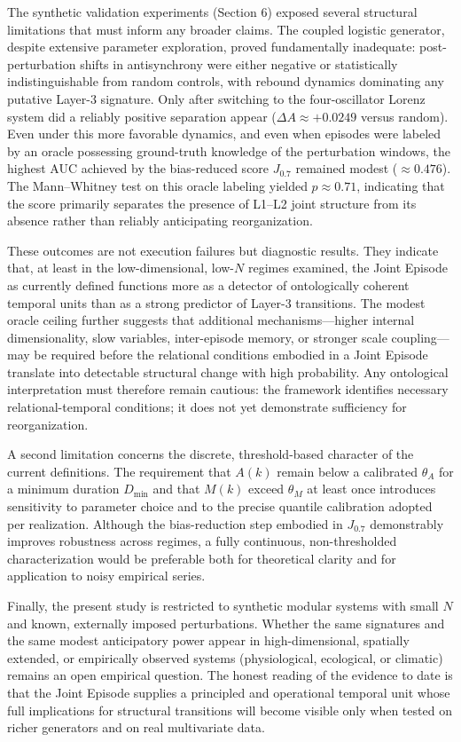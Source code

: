 The synthetic validation experiments (Section 6) exposed several structural limitations that must inform any broader claims. The coupled logistic generator, despite extensive parameter exploration, proved fundamentally inadequate: post-perturbation shifts in antisynchrony were either negative or statistically indistinguishable from random controls, with rebound dynamics dominating any putative Layer-3 signature. Only after switching to the four-oscillator Lorenz system did a reliably positive separation appear ($\Delta A \approx +0.0249$ versus random). Even under this more favorable dynamics, and even when episodes were labeled by an oracle possessing ground-truth knowledge of the perturbation windows, the highest AUC achieved by the bias-reduced score $J_{0.7}$ remained modest ($\approx 0.476$). The Mann--Whitney test on this oracle labeling yielded $p \approx 0.71$, indicating that the score primarily separates the presence of L1--L2 joint structure from its absence rather than reliably anticipating reorganization.

These outcomes are not execution failures but diagnostic results. They indicate that, at least in the low-dimensional, low-$N$ regimes examined, the Joint Episode as currently defined functions more as a detector of ontologically coherent temporal units than as a strong predictor of Layer-3 transitions. The modest oracle ceiling further suggests that additional mechanisms---higher internal dimensionality, slow variables, inter-episode memory, or stronger scale coupling---may be required before the relational conditions embodied in a Joint Episode translate into detectable structural change with high probability. Any ontological interpretation must therefore remain cautious: the framework identifies necessary relational-temporal conditions; it does not yet demonstrate sufficiency for reorganization.

A second limitation concerns the discrete, threshold-based character of the current definitions. The requirement that $A(k)$ remain below a calibrated $\theta_A$ for a minimum duration $D_{\min}$ and that $M(k)$ exceed $\theta_M$ at least once introduces sensitivity to parameter choice and to the precise quantile calibration adopted per realization. Although the bias-reduction step embodied in $J_{0.7}$ demonstrably improves robustness across regimes, a fully continuous, non-thresholded characterization would be preferable both for theoretical clarity and for application to noisy empirical series.

Finally, the present study is restricted to synthetic modular systems with small $N$ and known, externally imposed perturbations. Whether the same signatures and the same modest anticipatory power appear in high-dimensional, spatially extended, or empirically observed systems (physiological, ecological, or climatic) remains an open empirical question. The honest reading of the evidence to date is that the Joint Episode supplies a principled and operational temporal unit whose full implications for structural transitions will become visible only when tested on richer generators and on real multivariate data.

